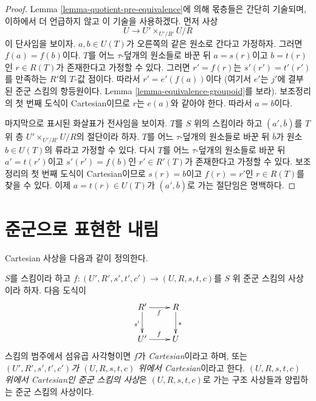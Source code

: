 \begin{proof}
Lemma \ref{lemma-quotient-pre-equivalence}에 의해 몫층들은 간단히 기술되며, 이하에서 더 언급하지 않고 이 기술을 사용하겠다.
먼저 사상
$$
U \longrightarrow U' \times_{U'/R'} U/R
$$
이 단사임을 보이자. $a, b \in U(T)$가 오른쪽의 같은 원소로 간다고 가정하자. 그러면 $f(a) = f(b)$이다.
$T$를 어느 $\tau$-덮개의 원소들로 바꾼 뒤 $a = s(r)$이고 $b = t(r)$인 $r \in R(T)$가 존재한다고 가정할 수 있다.
그러면 $r' = f(r)$는 $s'(r') = t'(r')$를 만족하는 $R'$의 $T$-값 점이다. 따라서 $r' = e'(f(a))$이다
(여기서 $e'$는 $j'$에 결부된 준군 스킴의 항등원이다. Lemma \ref{lemma-equivalence-groupoid}를 보라).
보조정리의 첫 번째 도식이 Cartesian이므로 $r$는 $e(a)$와 같아야 한다. 따라서 $a = b$이다.

\medskip\noindent
마지막으로 표시된 화살표가 전사임을 보이자. $T$를 $S$ 위의 스킴이라 하고 $(a', \overline{b})$를 $T$ 위 층
$U' \times_{U'/R'} U/R$의 절단이라 하자. $T$를 어느 $\tau$-덮개의 원소들로 바꾼 뒤 $\overline{b}$가
원소 $b \in U(T)$의 류라고 가정할 수 있다. 다시 $T$를 어느 $\tau$-덮개의 원소들로 바꾼 뒤
$a' = t(r')$이고 $s'(r') = f(b)$인 $r' \in R'(T)$가 존재한다고 가정할 수 있다. 보조정리의 첫 번째 도식이
Cartesian이므로 $s(r) = b$이고 $f(r) = r'$인 $r \in R(T)$를 찾을 수 있다. 이제
$a = t(r) \in U(T)$가 $(a', \overline{b})$로 가는 절단임은 명백하다.
\end{proof}








\section{준군으로 표현한 내림}
\label{section-groupoids-descent}

\noindent
Cartesian 사상을 다음과 같이 정의한다.

\begin{definition}
\label{definition-cartesian-morphism}
$S$를 스킴이라 하고 $f : (U', R', s', t', c') \to (U, R, s, t, c)$를 $S$ 위 준군 스킴의 사상이라 하자.
다음 도식이
$$
\xymatrix{
R' \ar[r]_f \ar[d]_{s'} & R \ar[d]^s \\
U' \ar[r]^f & U
}
$$
스킴의 범주에서 섬유곱 사각형이면 $f$가 {\it Cartesian}이라고 하며, 또는
{\it $(U', R', s', t', c')$가 $(U, R, s, t, c)$ 위에서 Cartesian}이라고 한다.
{\it $(U, R, s, t, c)$ 위에서 Cartesian인 준군 스킴의 사상}은 $(U, R, s, t, c)$로 가는 구조 사상들과
양립하는 준군 스킴의 사상이다.
\end{definition}

